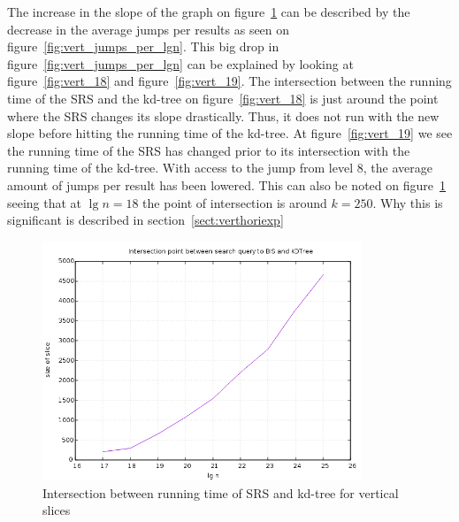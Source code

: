 The increase in the slope of the graph on figure~\ref{fig:vert_intersection} can be described by the decrease in the average jumps per results as seen on figure~\ref{fig:vert_jumps_per_lgn}. This big drop in figure~\ref{fig:vert_jumps_per_lgn} can be explained by looking at figure~\ref{fig:vert_18} and figure~\ref{fig:vert_19}. The intersection between the running time of the SRS and the kd-tree on figure~\ref{fig:vert_18} is just around the point where the SRS changes its slope drastically. Thus, it does not run with the new slope before hitting the running time of the kd-tree. At figure~\ref{fig:vert_19} we see the running time of the SRS has changed prior to its intersection with the running time of the kd-tree. With access to the jump from level $8$, the average amount of jumps per result has been lowered. This can also be noted on figure~\ref{fig:vert_intersection} seeing that at $\lg n = 18$ the point of intersection is around $k=250$. Why this is significant is described in section~\ref{sect:verthoriexp}

\begin{figure}[h]
    \centering
    \includegraphics[width = 0.85\textwidth]{pictures/analysis/vert.png}
    \caption{Intersection between running time of SRS and kd-tree for vertical slices}\label{fig:vert_intersection}
\end{figure}


